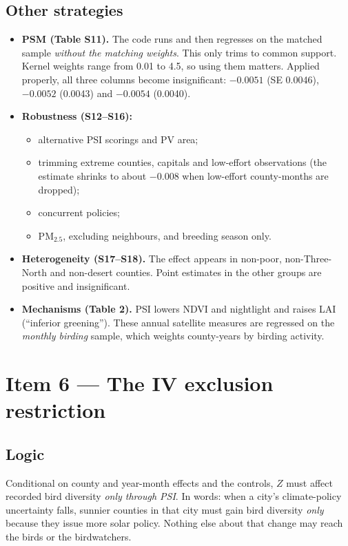 \documentclass[11pt]{article}
\begin{document}
\subsection{Other strategies}
\begin{itemize}
\item \textbf{PSM (Table S11).} The code runs  and then regresses on the matched sample \emph{without the matching weights}. This only trims to common support. Kernel weights range from 0.01 to 4.5, so using them matters. Applied properly, all three columns become insignificant: $-0.0051$ (SE 0.0046), $-0.0052$ (0.0043) and $-0.0054$ (0.0040).
\item \textbf{Robustness (S12--S16):}
  \begin{itemize}
  \item alternative PSI scorings and PV area;
  \item trimming extreme counties, capitals and low-effort observations (the estimate shrinks to about $-0.008$ when low-effort county-months are dropped);
  \item concurrent policies;
  \item PM$_{2.5}$, excluding neighbours, and breeding season only.
  \end{itemize}
\item \textbf{Heterogeneity (S17--S18).} The effect appears in non-poor, non-Three-North and non-desert counties. Point estimates in the other groups are positive and insignificant.
\item \textbf{Mechanisms (Table 2).} PSI lowers NDVI and nightlight and raises LAI (``inferior greening''). These annual satellite measures are regressed on the \emph{monthly birding} sample, which weights county-years by birding activity.
\end{itemize}

\section{Item 6 --- The IV exclusion restriction}

\subsection{Logic}
Conditional on county and year-month effects and the controls, $Z$ must affect recorded bird diversity \emph{only through PSI}. In words: when a city's climate-policy uncertainty falls, sunnier counties in that city must gain bird diversity \emph{only} because they issue more solar policy. Nothing else about that change may reach the birds or the birdwatchers.
\end{document}

